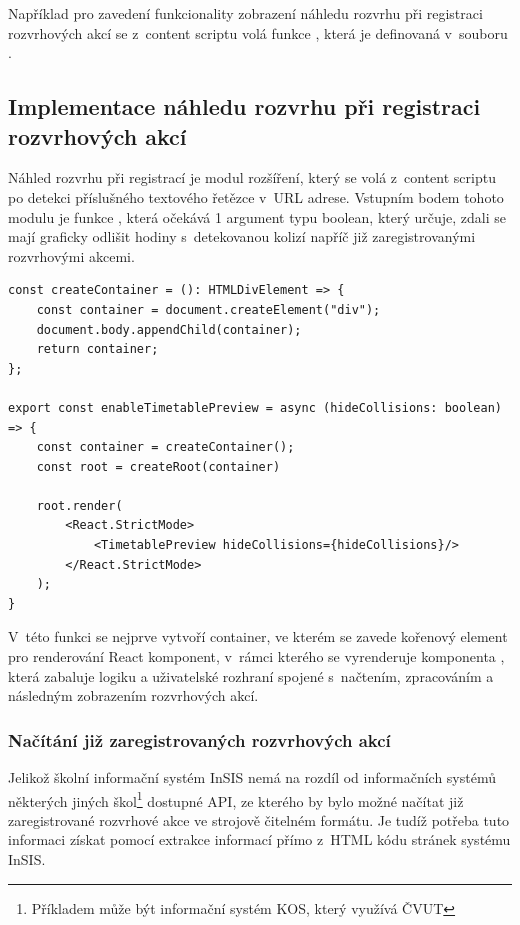 Například pro zavedení funkcionality zobrazení náhledu rozvrhu při registraci rozvrhových akcí se z~content scriptu volá funkce , která je definovaná v~souboru .

\subsection{Implementace náhledu rozvrhu při registraci rozvrhových akcí}

Náhled rozvrhu při registrací je modul rozšíření, který se volá z~content scriptu po detekci příslušného textového řetězce v~URL adrese. Vstupním bodem tohoto modulu je funkce , která očekává 1 argument typu boolean, který určuje, zdali se mají graficky odlišit hodiny s~detekovanou kolizí napříč již zaregistrovanými rozvrhovými akcemi.

\begin{lstlisting}[label={code:enable-timetable-preview}, caption={Definice funkce \code{enableTimetablePreview} (vlastní zpracování)}]
const createContainer = (): HTMLDivElement => {
    const container = document.createElement("div");
    document.body.appendChild(container);
    return container;
};

export const enableTimetablePreview = async (hideCollisions: boolean) => {
    const container = createContainer();
    const root = createRoot(container)

    root.render(
        <React.StrictMode>
            <TimetablePreview hideCollisions={hideCollisions}/>
        </React.StrictMode>
    );
}
\end{lstlisting}

V~této funkci se nejprve vytvoří container, ve kterém se zavede kořenový element pro renderování React komponent, v~rámci kterého se vyrenderuje komponenta , která zabaluje logiku a uživatelské rozhraní spojené s~načtením, zpracováním a následným zobrazením rozvrhových akcí. 

\subsubsection{Načítání již zaregistrovaných rozvrhových akcí}

Jelikož školní informační systém InSIS nemá na rozdíl od informačních systémů některých jiných škol\footnote{Příkladem může být informační systém KOS, který využívá ČVUT} dostupné API, ze kterého by bylo možné načítat již zaregistrované rozvrhové akce ve strojově čitelném formátu. Je tudíž potřeba tuto informaci získat pomocí extrakce informací přímo z~HTML kódu stránek systému InSIS. 

